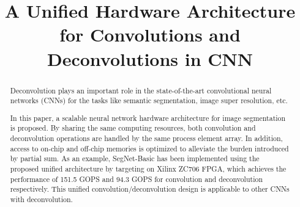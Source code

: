 \documentclass[conference]{IEEEtran}
\begin{document}
%
\title{A Unified Hardware Architecture for Convolutions and Deconvolutions in CNN}


\author{
}


\maketitle

\begin{abstract}
Deconvolution plays an important role in the state-of-the-art convolutional neural networks (CNNs) for the tasks like semantic segmentation, image super resolution, etc. 
\begin{comment}
image denoising \cite{ref:denoise_2017}, 
etc. However, its intrinsic property like computation complexity prevents it from real-time applications.
\end{comment} 
In this paper, a scalable neural network hardware architecture for image segmentation is proposed. By sharing the same computing resources, both convolution and deconvolution operations are handled by the same process element array. In addition, access to on-chip and off-chip memories is optimized to alleviate the burden introduced by partial sum. As an example, SegNet-Basic has been implemented using the proposed unified architecture by targeting on Xilinx ZC706 FPGA, which achieves the performance of 151.5 GOPS and 94.3 GOPS for convolution and deconvolution respectively. This unified convolution/deconvolution design is applicable to other CNNs with deconvolution.  
\end{abstract}
\end{document}
